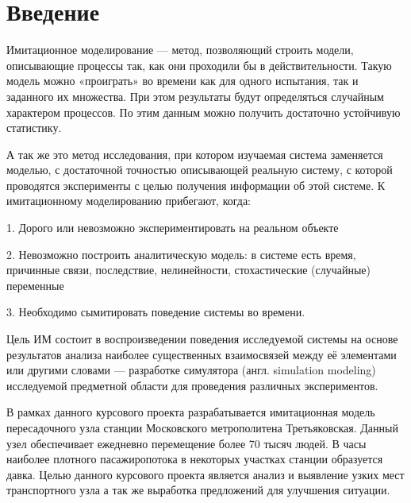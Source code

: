 \documentclass[12pt]{article}
\begin{document}
\fontsize{14}{16pt}\selectfont


	\begin{titlepage}
	
	\end{titlepage}

	
	\tableofcontents %
	\newpage
	
	
	\part*{\centering Введение}
	\hspace{\parindent}Имитационное моделирование —  метод, позволяющий строить модели, описывающие процессы так, как они проходили бы в действительности. Такую модель можно «проиграть» во времени как для одного испытания, так и заданного их множества. При этом результаты будут определяться случайным характером процессов. По этим данным можно получить достаточно устойчивую статистику.

А так же это метод исследования, при котором изучаемая система заменяется моделью, с достаточной точностью описывающей реальную систему, с которой проводятся эксперименты с целью получения информации об этой системе.
К имитационному моделированию прибегают, когда:

1. Дорого или невозможно экспериментировать на реальном объекте

2. Невозможно построить аналитическую модель: в системе есть время, причинные связи, последствие, нелинейности, стохастические (случайные) переменные

3. Необходимо сымитировать поведение системы во времени.


	Цель ИМ состоит в воспроизведении поведения исследуемой системы на основе результатов анализа наиболее существенных взаимосвязей между её элементами или другими словами — разработке симулятора (англ. simulation modeling) исследуемой предметной области для проведения различных экспериментов.

В рамках данного курсового проекта разрабатывается имитационная модель пересадочного узла станции Московского метрополитена Третьяковская. Данный узел обеспечивает ежедневно перемещение более 70 тысяч людей. В часы наиболее плотного пасажиропотока в некоторых участках станции образуется давка. Целью данного курсового проекта является анализ и выявление узких мест транспортного узла а так же выработка предложений для улучшения ситуации. 
\end{document}
